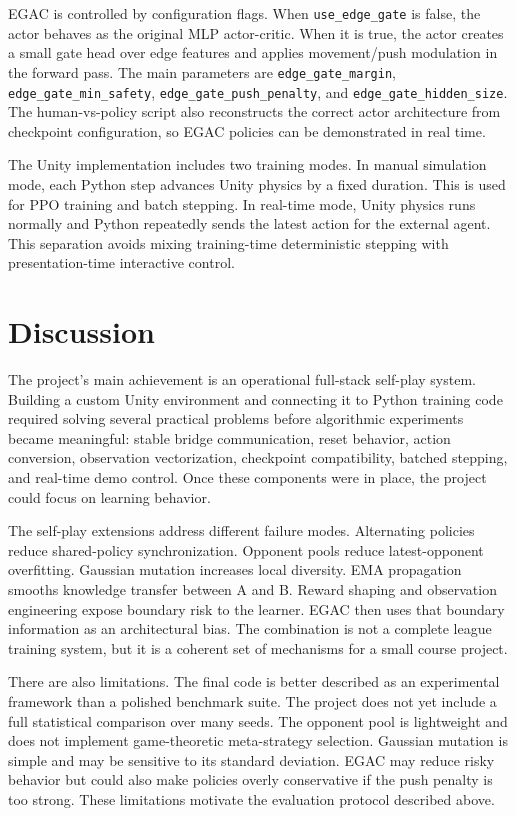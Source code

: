 \documentclass{article}
\begin{document}
EGAC is controlled by configuration flags. When \texttt{use\_edge\_gate} is false, the actor behaves as the original MLP actor-critic. When it is true, the actor creates a small gate head over edge features and applies movement/push modulation in the forward pass. The main parameters are \texttt{edge\_gate\_margin}, \texttt{edge\_gate\_min\_safety}, \texttt{edge\_gate\_push\_penalty}, and \texttt{edge\_gate\_hidden\_size}. The human-vs-policy script also reconstructs the correct actor architecture from checkpoint configuration, so EGAC policies can be demonstrated in real time.

The Unity implementation includes two training modes. In manual simulation mode, each Python step advances Unity physics by a fixed duration. This is used for PPO training and batch stepping. In real-time mode, Unity physics runs normally and Python repeatedly sends the latest action for the external agent. This separation avoids mixing training-time deterministic stepping with presentation-time interactive control.

\section{Discussion}

The project's main achievement is an operational full-stack self-play system. Building a custom Unity environment and connecting it to Python training code required solving several practical problems before algorithmic experiments became meaningful: stable bridge communication, reset behavior, action conversion, observation vectorization, checkpoint compatibility, batched stepping, and real-time demo control. Once these components were in place, the project could focus on learning behavior.

The self-play extensions address different failure modes. Alternating policies reduce shared-policy synchronization. Opponent pools reduce latest-opponent overfitting. Gaussian mutation increases local diversity. EMA propagation smooths knowledge transfer between A and B. Reward shaping and observation engineering expose boundary risk to the learner. EGAC then uses that boundary information as an architectural bias. The combination is not a complete league training system, but it is a coherent set of mechanisms for a small course project.

There are also limitations. The final code is better described as an experimental framework than a polished benchmark suite. The project does not yet include a full statistical comparison over many seeds. The opponent pool is lightweight and does not implement game-theoretic meta-strategy selection. Gaussian mutation is simple and may be sensitive to its standard deviation. EGAC may reduce risky behavior but could also make policies overly conservative if the push penalty is too strong. These limitations motivate the evaluation protocol described above.
\end{document}

